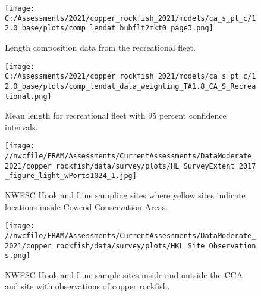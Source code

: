 \documentclass[11pt,
  english,
  a4paper,
]{article}
\begin{document}
\tagmcend\tagstructend


\begin{figure}
\centering
\texttt{[image: C:/Assessments/2021/copper\_rockfish\_2021/models/ca\_s\_pt\_c/12.0\_base/plots/comp\_lendat\_bubflt2mkt0\_page3.png]}
\caption{Length composition data from the recreational fleet.\label{fig:rec-len-data}}
\end{figure}

\tagmcend\tagstructend


\begin{figure}
\centering
\texttt{[image: C:/Assessments/2021/copper\_rockfish\_2021/models/ca\_s\_pt\_c/12.0\_base/plots/comp\_lendat\_data\_weighting\_TA1.8\_CA\_S\_Recreational.png]}
\caption{Mean length for recreational fleet with 95 percent confidence intervals.\label{fig:mean-rec-len-data}}
\end{figure}

\tagmcend\tagstructend


\begin{figure}
\centering
\texttt{[image: //nwcfile/FRAM/Assessments/CurrentAssessments/DataModerate\_2021/copper\_rockfish/data/survey/plots/HL\_SurveyExtent\_2017\_figure\_light\_wPorts1024\_1.jpg]}
\caption{NWFSC Hook and Line sampling sites where yellow sites indicate locations inside Cowcod Conservation Areas.\label{fig:hkl-sites}}
\end{figure}

\tagmcend\tagstructend


\begin{figure}
\centering
\texttt{[image: //nwcfile/FRAM/Assessments/CurrentAssessments/DataModerate\_2021/copper\_rockfish/data/survey/plots/HKL\_Site\_Observations.png]}
\caption{NWFSC Hook and Line sample sites inside and outside the CCA and site with observations of copper rockfish.\label{fig:hkl-site-ob}}
\end{figure}
\end{document}

